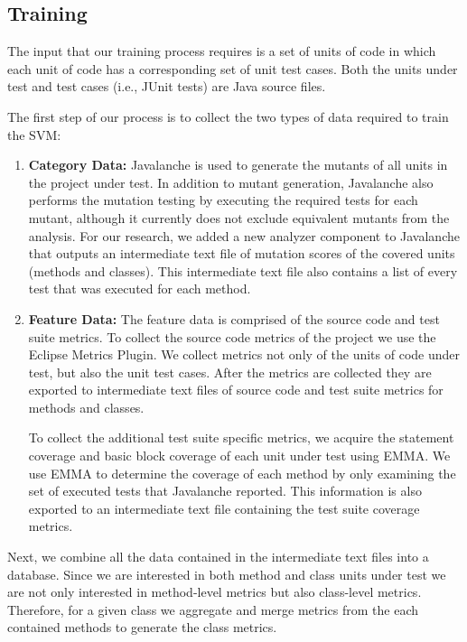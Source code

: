 \documentclass[conference]{IEEEtran}
\begin{document}
\subsection{Training}
\label{subsec:training}
The input that our training process requires is a set of units of code in which each unit of code has a corresponding set of unit test cases. Both the units under test and test cases (i.e., JUnit tests) are Java source files.

The first step of our process is to collect the two types of data required to train the SVM:

\begin{enumerate}
  \item \textbf{Category Data:} Javalanche is used to generate the mutants of all units in the project under test. In addition to mutant generation, Javalanche also performs the mutation testing by executing the required tests for each mutant, although it currently does not exclude equivalent mutants from the analysis. For our research, we added a new analyzer component to Javalanche that outputs an intermediate text file of mutation scores of the covered units (methods and classes). This intermediate text file also contains a list of every test that was executed for each method.

  \item \textbf{Feature Data:} The feature data is comprised of the source code and test suite metrics. To collect the source code metrics of the project we use the Eclipse Metrics Plugin. We collect metrics not only of the units of code under test, but also the unit test cases. After the metrics are collected they are exported to intermediate text files of source code and test suite metrics for methods and classes.

  To collect the additional test suite specific metrics, we acquire the statement coverage and basic block coverage of each unit under test using EMMA. We use EMMA to determine the  coverage of each method by only examining the set of executed tests that Javalanche reported. This information is also exported to an intermediate text file containing the test suite coverage metrics.
\end{enumerate}

Next, we combine all the data contained in the intermediate text files into a database. Since we are interested in both method and class units under test we are not only interested in method-level metrics but also class-level metrics. Therefore, for a given class we aggregate and merge metrics from the each contained methods to generate the class metrics.
\end{document}
